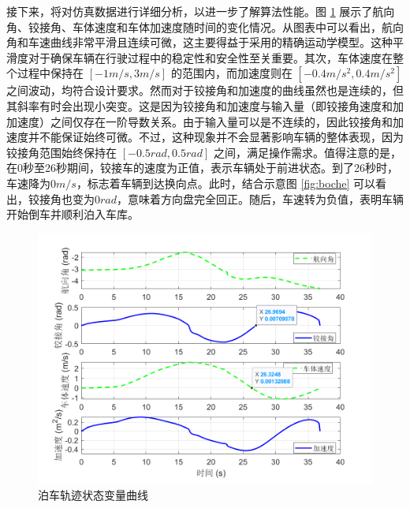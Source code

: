 \documentclass[master,academic]{ysuthesis} %
\begin{document}
		接下来，将对仿真数据进行详细分析，以进一步了解算法性能。图 \ref{fig:databochestate} 展示了航向角、铰接角、车体速度和车体加速度随时间的变化情况。从图表中可以看出，航向角和车速曲线非常平滑且连续可微，这主要得益于采用的精确运动学模型。这种平滑度对于确保车辆在行驶过程中的稳定性和安全性至关重要。其次，车体速度在整个过程中保持在 $[-1m/s, 3m/s]$ 的范围内，而加速度则在 $[-0.4m/s^2, 0.4m/s^2]$ 之间波动，均符合设计要求。然而对于铰接角和加速度的曲线虽然也是连续的，但其斜率有时会出现小突变。这是因为铰接角和加速度与输入量（即铰接角速度和加加速度）之间仅存在一阶导数关系。由于输入量可以是不连续的，因此铰接角和加速度并不能保证始终可微。不过，这种现象并不会显著影响车辆的整体表现，因为铰接角范围始终保持在 $[-0.5rad, 0.5rad]$ 之间，满足操作需求。值得注意的是，在0秒至26秒期间，铰接车的速度为正值，表示车辆处于前进状态。到了26秒时，车速降为$0 m/s$，标志着车辆到达换向点。此时，结合示意图 \ref{fig:boche} 可以看出，铰接角也变为$0 rad$，意味着方向盘完全回正。随后，车速转为负值，表明车辆开始倒车并顺利泊入车库。
		\begin{figure}[!ht]
			\centering
			\includegraphics[width=1\textwidth]{databochestate.png}
			\caption{泊车轨迹状态变量曲线}
			\label{fig:databochestate}
		\end{figure}
\end{document}
